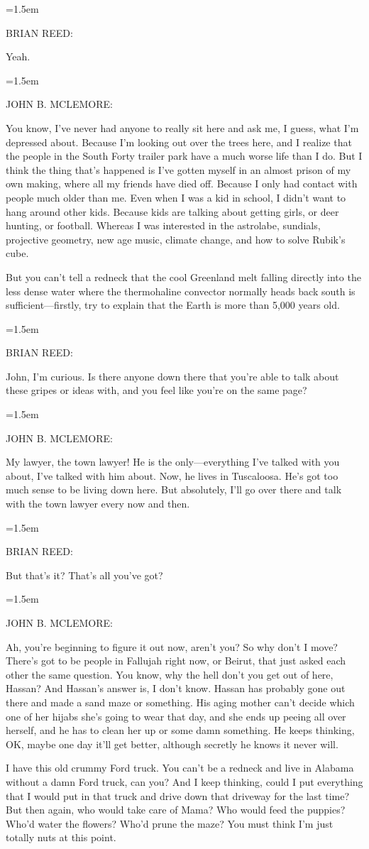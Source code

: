 \documentclass[10pt,a4paper]{article}
\newcommand{\speakerlabel}[1]{{\plantin\color{speakerblue}\MakeUppercase{#1}:}}
\newenvironment{speech}[1]{%
		\par\medskip
		\begin{list}{}{%
			\leftmargin=1.5em
			\rightmargin=0pt
			\topsep=0pt
			\partopsep=0pt
			\parsep=0.5\baselineskip
			\itemsep=0pt}%
		\item\speakerlabel{#1}\enspace\ignorespaces
	}{\end{list}}
\begin{document}
\begin{speech}{BRIAN REED}
Yeah.
\end{speech}
\begin{speech}{JOHN B. McLEMORE}
You know, I've never had anyone to really sit here and ask me, I guess, what I'm depressed about. Because I'm looking out over the trees here, and I realize that the people in the South Forty trailer park have a much worse life than I do. But I think the thing that's happened is I've gotten myself in an almost prison of my own making, where all my friends have died off. Because I only had contact with people much older than me. Even when I was a kid in school, I didn't want to hang around other kids. Because kids are talking about getting girls, or deer hunting, or football. Whereas I was interested in the astrolabe, sundials, projective geometry, new age music, climate change, and how to solve Rubik's cube.

But you can't tell a redneck that the cool Greenland melt falling directly into the less dense water where the thermohaline convector normally heads back south is sufficient—firstly, try to explain that the Earth is more than 5,000 years old.
\end{speech}
\begin{speech}{BRIAN REED}
John, I'm curious. Is there anyone down there that you're able to talk about these gripes or ideas with, and you feel like you're on the same page?
\end{speech}
\begin{speech}{JOHN B. McLEMORE}
My lawyer, the town lawyer! He is the only—everything I've talked with you about, I've talked with him about. Now, he lives in Tuscaloosa. He's got too much sense to be living down here. But absolutely, I'll go over there and talk with the town lawyer every now and then.
\end{speech}
\begin{speech}{BRIAN REED}
But that's it? That's all you've got?
\end{speech}
\begin{speech}{JOHN B. McLEMORE}
Ah, you're beginning to figure it out now, aren't you? So why don't I move? There's got to be people in Fallujah right now, or Beirut, that just asked each other the same question. You know, why the hell don't you get out of here, Hassan? And Hassan's answer is, I don't know. Hassan has probably gone out there and made a sand maze or something. His aging mother can't decide which one of her hijabs she's going to wear that day, and she ends up peeing all over herself, and he has to clean her up or some damn something. He keeps thinking, OK, maybe one day it'll get better, although secretly he knows it never will.

I have this old crummy Ford truck. You can't be a redneck and live in Alabama without a damn Ford truck, can you? And I keep thinking, could I put everything that I would put in that truck and drive down that driveway for the last time? But then again, who would take care of Mama? Who would feed the puppies? Who'd water the flowers? Who'd prune the maze? You must think I'm just totally nuts at this point.
\end{speech}
\end{document}
